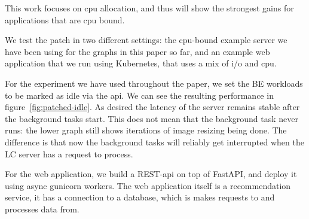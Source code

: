 This work focuses on cpu allocation, and thus will show the strongest gains for
applications that are cpu bound. 

We test the patch in two different settings: the cpu-bound example server we
have been using for the graphs in this paper so far, and an example web application
that we run using Kubernetes, that uses a mix of i/o and cpu.

For the experiment we have used throughout the paper, we set the BE workloads to
be marked as idle via the \cgroups{} api. We can see the resulting performance
in figure~\ref{fig:patched-idle}. As desired the latency of the server remains
stable after the background tasks start. This does not mean that the background
task never runs: the lower graph still shows iterations of image resizing being
done. The difference is that now the background tasks will reliably get
interrupted when the LC server has a request to process.

For the web application, we build a REST-api on top of FastAPI, and deploy it
using async gunicorn workers. The web application itself is a recommendation
service, it has a connection to a database, which is makes requests to and
processes data from.

